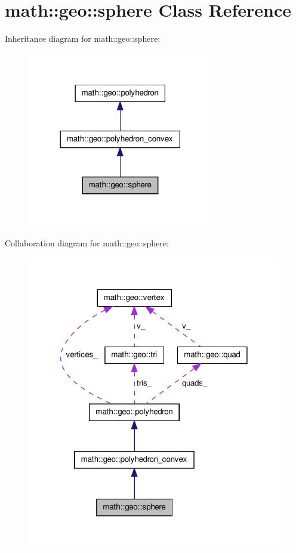 \hypertarget{classmath_1_1geo_1_1sphere}{\section{math\-:\-:geo\-:\-:sphere \-Class \-Reference}
\label{classmath_1_1geo_1_1sphere}
}


\-Inheritance diagram for math\-:\-:geo\-:\-:sphere\-:\nopagebreak
\begin{figure}[H]
\begin{center}
\leavevmode
\includegraphics[width=230pt]{classmath_1_1geo_1_1sphere__inherit__graph}
\end{center}
\end{figure}


\-Collaboration diagram for math\-:\-:geo\-:\-:sphere\-:\nopagebreak
\begin{figure}[H]
\begin{center}
\leavevmode
\includegraphics[width=314pt]{classmath_1_1geo_1_1sphere__coll__graph}
\end{center}
\end{figure}
